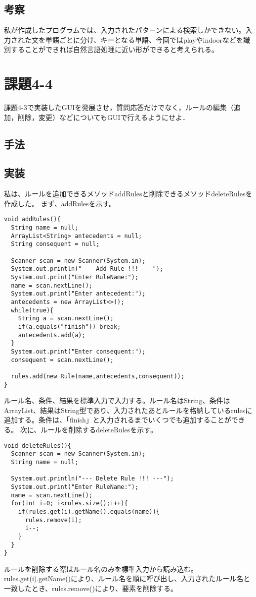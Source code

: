 \documentclass[a4j]{jarticle}
\begin{document}
\subsection{考察}
私が作成したプログラムでは、入力されたパターンによる検索しかできない。入力された文を単語ごとに分け、キーとなる単語、今回ではplayやindoorなどを識別することができれば自然言語処理に近い形ができると考えられる。

\section{課題4-4}
\begin{screen}
課題4-3で実装したGUIを発展させ，質問応答だけでなく，ルールの編集（追加，削除，変更）などについてもGUIで行えるようにせよ．
\end{screen}

\subsection{手法}

\subsection{実装}
私は、ルールを追加できるメソッドaddRulesと削除できるメソッドdeleteRulesを作成した。
まず、addRulesを示す。
\begin{lstlisting}[caption=addRulesメソッド]
void addRules(){
  String name = null;
  ArrayList<String> antecedents = null;
  String consequent = null;

  Scanner scan = new Scanner(System.in);
  System.out.println("--- Add Rule !!! ---");
  System.out.print("Enter RuleName:");
  name = scan.nextLine();
  System.out.print("Enter antecedent:");
  antecedents = new ArrayList<>();
  while(true){
    String a = scan.nextLine();
    if(a.equals("finish")) break;
    antecedents.add(a);
  }
  System.out.print("Enter consequent:");
  consequent = scan.nextLine();

  rules.add(new Rule(name,antecedents,consequent));
}
\end{lstlisting}
ルール名、条件、結果を標準入力で入力する。ルール名はString、条件はArrayList、結果はString型であり、入力されたあとルールを格納しているrulesに追加する。条件は、「finish」と入力されるまでいくつでも追加することができる。
次に、ルールを削除するdeleteRulesを示す。
\begin{lstlisting}[caption=deleteRulesメソッド]
void deleteRules(){
  Scanner scan = new Scanner(System.in);
  String name = null;

  System.out.println("--- Delete Rule !!! ---");
  System.out.print("Enter RuleName:");
  name = scan.nextLine();
  for(int i=0; i<rules.size();i++){
    if(rules.get(i).getName().equals(name)){
      rules.remove(i);
      i--;
    }
  }
}
\end{lstlisting}
ルールを削除する際はルール名のみを標準入力から読み込む。rules.get(i).getName()により、ルール名を順に呼び出し、入力されたルール名と一致したとき、rules.remove()により、要素を削除する。
\end{document}

